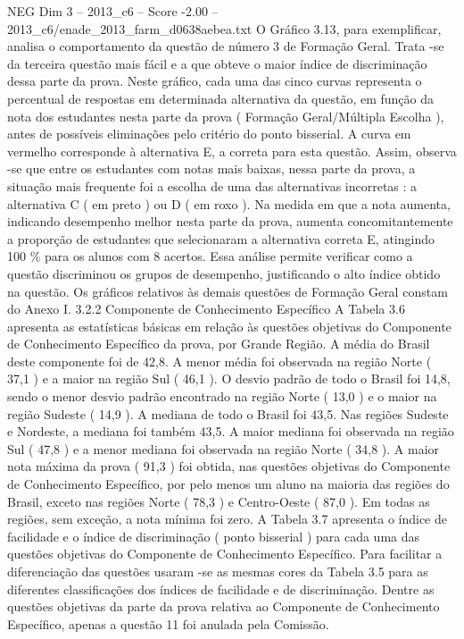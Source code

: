 \begin{textsample}{NEG Dim 3 – 2013\_c6 – Score -2.00 – 2013\_c6/enade\_2013\_farm\_d0638aebea.txt}
O Gráfico 3.13, para exemplificar, analisa o comportamento da questão de número 3 de Formação Geral.
Trata -se da terceira questão mais fácil e a que obteve o maior índice de discriminação dessa parte da prova.
Neste gráfico, cada uma das cinco curvas representa o percentual de respostas em determinada alternativa da questão, em função da nota dos estudantes nesta parte da prova ( Formação Geral/Múltipla Escolha ), antes de possíveis eliminações pelo critério do ponto bisserial.
A curva em vermelho corresponde à alternativa E, a correta para esta questão.
Assim, observa -se que entre os estudantes com notas mais baixas, nessa parte da prova, a situação mais frequente foi a escolha de uma das alternativas incorretas : a alternativa C ( em preto ) ou D ( em roxo ).
Na medida em que a nota aumenta, indicando desempenho melhor nesta parte da prova, aumenta concomitantemente a proporção de estudantes que selecionaram a alternativa correta E, atingindo 100 \% para os alunos com 8 acertos.
Essa análise permite verificar como a questão discriminou os grupos de desempenho, justificando o alto índice obtido na questão.
Os gráficos relativos às demais questões de Formação Geral constam do Anexo I. 3.2.2 Componente de Conhecimento Específico A Tabela 3.6 apresenta as estatísticas básicas em relação às questões objetivas do Componente de Conhecimento Específico da prova, por Grande Região.
A média do Brasil deste componente foi de 42,8.
A menor média foi observada na região Norte ( 37,1 ) e a maior na região Sul ( 46,1 ).
O desvio padrão de todo o Brasil foi 14,8, sendo o menor desvio padrão encontrado na região Norte ( 13,0 ) e o maior na região Sudeste ( 14,9 ).
A mediana de todo o Brasil foi 43,5.
Nas regiões Sudeste e Nordeste, a mediana foi também 43,5.
A maior mediana foi observada na região Sul ( 47,8 ) e a menor mediana foi observada na região Norte ( 34,8 ).
A maior nota máxima da prova ( 91,3 ) foi obtida, nas questões objetivas do Componente de Conhecimento Específico, por pelo menos um aluno na maioria das regiões do Brasil, exceto nas regiões Norte ( 78,3 ) e Centro-Oeste ( 87,0 ).
Em todas as regiões, sem exceção, a nota mínima foi zero.
A Tabela 3.7 apresenta o índice de facilidade e o índice de discriminação ( ponto bisserial ) para cada uma das questões objetivas do Componente de Conhecimento Específico.
Para facilitar a diferenciação das questões usaram -se as mesmas cores da Tabela 3.5 para as diferentes classificações dos índices de facilidade e de discriminação.
Dentre as questões objetivas da parte da prova relativa ao Componente de Conhecimento Específico, apenas a questão 11 foi anulada pela Comissão.

\end{textsample}
